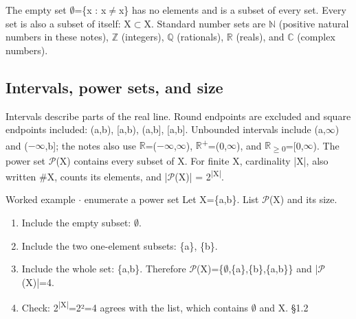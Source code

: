 \documentclass[11pt]{article}
\begin{document}
\begin{keepsection}
\begin{keepsection}
The empty set \ensuremath{\emptyset}=\{x : x\ensuremath{\neq}x\} has no elements and is a subset of every set. Every set is also a subset of itself: X\ensuremath{\subset}X. Standard number sets are \ensuremath{\mathbb{N}} (positive natural numbers in these notes), \ensuremath{\mathbb{Z}} (integers), \ensuremath{\mathbb{Q}} (rationals), \ensuremath{\mathbb{R}} (reals), and \ensuremath{\mathbb{C}} (complex numbers).
\end{keepsection}

\begin{keepsection}
\subsection{Intervals, power sets, and size}

Intervals describe parts of the real line. Round endpoints are excluded and square endpoints included: (a,b), [a,b), (a,b], [a,b]. Unbounded intervals include (a,\ensuremath{\infty}) and (\ensuremath{-}\ensuremath{\infty},b]; the notes also use \ensuremath{\mathbb{R}}=(\ensuremath{-}\ensuremath{\infty},\ensuremath{\infty}), \ensuremath{\mathbb{R}}\textsuperscript{+}=(0,\ensuremath{\infty}), and \ensuremath{\mathbb{R}}\textsubscript{\ensuremath{\geq}0}=[0,\ensuremath{\infty}). The power set \ensuremath{\mathcal{P}}(X) contains every subset of X. For finite X, cardinality |X|, also written \#X, counts its elements, and |\ensuremath{\mathcal{P}}(X)| = 2\textsuperscript{|X|}.

\begin{workedbox}{Worked example \ensuremath{\cdot} enumerate a power set}
Let X=\{a,b\}. List \ensuremath{\mathcal{P}}(X) and its size.

\begin{enumerate}
\item Include the empty subset: \ensuremath{\emptyset}.
\item Include the two one-element subsets: \{a\}, \{b\}.
\item Include the whole set: \{a,b\}. Therefore \ensuremath{\mathcal{P}}(X)=\{\ensuremath{\emptyset},\{a\},\{b\},\{a,b\}\} and |\ensuremath{\mathcal{P}}(X)|=4.
\item Check: 2\textsuperscript{|X|}=2²=4 agrees with the list, which contains \ensuremath{\emptyset} and X. \hfill{\small\color{FAUblue}§1.2}
\end{enumerate}
\end{workedbox}
\end{keepsection}


\end{keepsection}
\end{document}
